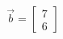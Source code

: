 \documentclass[preview]{standalone}
\begin{document}
\begin{align*}
\vec{b} = \begin{bmatrix} 7 \\ 6 \end{bmatrix}
\end{align*}
\end{document}
